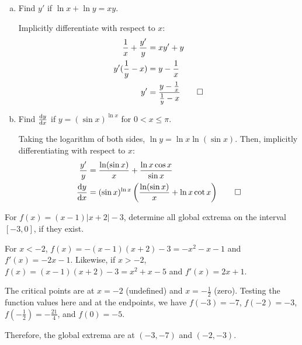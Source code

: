 \begin{prob}
  \begin{enumerate}[(a)]
    \item Find $y'$ if $\ln x + \ln y = xy$.
          \begin{sol}
            Implicitly differentiate with respect to $x$: \begin{align*}
              \frac{1}{x} + \frac{y'}{y} & = xy' + y                                      \\
              y'(\frac{1}{y} - x)        & = y - \frac{1}{x}                              \\
              y'                         & = \frac{y-\frac{1}{x}}{\frac{1}{y}-x} \qedhere
            \end{align*}
          \end{sol}
    \item Find $\dv{y}{x}$ if $y = (\sin x)^{\ln x}$ for $0 < x \leq \pi$.
          \begin{sol}
            Taking the logarithm of both sides, $\ln y = \ln x \ln(\sin x)$.
            Then, implicitly differentiating with respect to $x$: \begin{align*}
              \frac{y'}{y} & = \frac{\ln(\sin x)}{x} + \frac{\ln x \cos x}{\sin x}                        \\
              \dv{y}{x}         & = (\sin x)^{\ln x}\left(\frac{\ln(\sin x)}{x} + \ln x \cot x\right) \qedhere
            \end{align*}
          \end{sol}
  \end{enumerate}
\end{prob}

\begin{prob}
  For $f(x) = (x-1)|x+2| - 3$, determine all global extrema on the interval $[-3,0]$, if they exist.
\end{prob}
\begin{sol}
  For $x < -2$, $f(x) = -(x-1)(x+2) - 3 = - x^2 - x - 1$ and $f'(x) = -2x - 1$.
  Likewise, if $x > -2$, $f(x) = (x-1)(x+2) - 3 = x^2 + x - 5$ and $f'(x) = 2x + 1$.

  The critical points are at $x = -2$ (undefined) and $x = -\frac12$ (zero).
  Testing the function values here and at the endpoints, we have
  $f(-3) = -7$, $f(-2) = -3$, $f(-\frac12) = -\frac{21}{4}$, and $f(0) = -5$.

  Therefore, the global extrema are at $(-3, -7)$ and $(-2, -3)$.
\end{sol}

